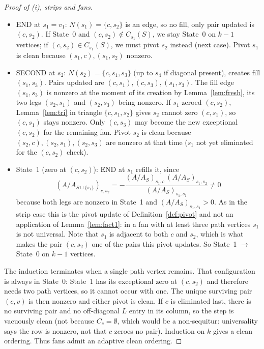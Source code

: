 \documentclass[11pt]{article}
\theoremstyle{plain}
\theoremstyle{definition}
\theoremstyle{remark}
\begin{document}
\begin{aiblock}
\begin{proof}[Proof of (i), strips and fans]
\begin{itemize}
\item END at $s_1=v_1$: $N(s_1)=\{c,s_2\}$ is an edge, so no fill, only pair updated is $(c,s_2)$. If State~0 and $(c,s_2)\notin C_{s_1}(S)$, we stay State~0 on $k-1$ vertices; if $(c,s_2)\in C_{s_1}(S)$, we must pivot $s_2$ instead (next case). Pivot $s_1$ is clean because $(s_1,c),(s_1,s_2)$ nonzero.
\item SECOND at $s_2$: $N(s_2)=\{c,s_1,s_3\}$ (up to $s_4$ if diagonal present), creates fill $(s_1,s_3)$. Pairs updated are $(c,s_1),(c,s_3),(s_1,s_3)$. The fill edge $(s_1,s_3)$ is nonzero at the moment
of its creation by Lemma~\ref{lem:fresh}, its two legs $(s_2,s_1)$ and $(s_2,s_3)$ being nonzero. If
$s_1$ zeroed $(c,s_2)$, Lemma~\ref{lem:tri} in triangle $\{c,s_1,s_2\}$ gives $s_2$ cannot zero $(c,s_1)$, so $(c,s_1)$ stays nonzero. Only $(c,s_3)$ may become the new exceptional $(c,s_2)$ for the remaining fan. Pivot $s_2$ is clean because $(s_2,c),(s_2,s_1),(s_2,s_3)$ are nonzero at that time ($s_1$ not yet eliminated for the $(c,s_2)$ check).
\item State~1 (zero at $(c,s_2)$): END at $s_1$ refills it, since
\[
(A/A_{S\cup\{s_1\}})_{c,s_2}
 = -\frac{(A/A_S)_{s_1,c}\,(A/A_S)_{s_1,s_2}}{(A/A_S)_{s_1,s_1}}\neq0
\]
because both legs are nonzero in State~1 and $(A/A_S)_{s_1,s_1}>0$. As in the strip case this is
the pivot update of Definition~\ref{def:pivot} and not an application of Lemma~\ref{lem:fact1}: in a
fan with at least three path vertices $s_1$ is not universal. Note that $s_1$ is adjacent to both $c$
and $s_2$, which is what makes the pair $(c,s_2)$ one of the pairs this pivot updates. So State~1
$\to$ State~0 on $k-1$ vertices.
\end{itemize}
The induction terminates when a single path vertex remains. That configuration is always in
State~0: State~1 has its exceptional zero at $(c,s_2)$ and therefore needs two path vertices, so it
cannot occur with one. The unique surviving pair $(c,v)$ is then nonzero and either pivot is clean.
If $c$ is eliminated last, there is no surviving pair and no off-diagonal $L$ entry in its column, so
the step is vacuously clean (not because $C_c=\emptyset$, which would be a non-sequitur: universality says the row is nonzero, not that $c$ zeroes no pair). Induction on $k$ gives a clean ordering. Thus fans admit an adaptive clean ordering.

\end{proof}


\end{aiblock}
\end{document}
